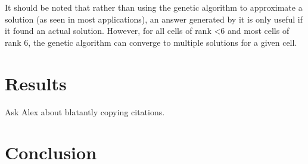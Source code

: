 \documentclass[12pt]{article}
\begin{document}
It should be noted that rather than using the genetic algorithm to approximate a solution (as seen in most applications), an answer generated by it is only useful if it found an actual solution. However, for all cells of rank \textless 6 and most cells of rank 6, the genetic algorithm can converge to multiple solutions for a given cell. 

\section{Results}

Ask Alex about blatantly copying citations.

\section{Conclusion}
\end{document}
